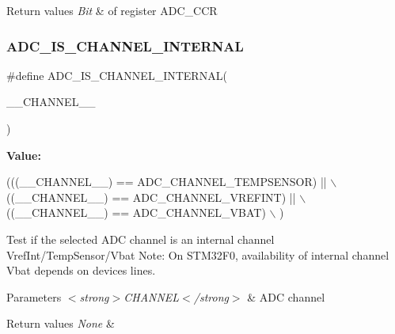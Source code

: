 \begin{DoxyRetVals}{Return values}
{\em Bit} & of register A\+D\+C\+\_\+\+C\+CR \\
\hline
\end{DoxyRetVals}
\mbox{\label{group___a_d_c_ex___private___macros_gafc2b5a27b9e60b2822591a19cbca11ff}} 
\subsubsection{\texorpdfstring{A\+D\+C\+\_\+\+I\+S\+\_\+\+C\+H\+A\+N\+N\+E\+L\+\_\+\+I\+N\+T\+E\+R\+N\+AL}{ADC\_IS\_CHANNEL\_INTERNAL}}
{\footnotesize\ttfamily \#define A\+D\+C\+\_\+\+I\+S\+\_\+\+C\+H\+A\+N\+N\+E\+L\+\_\+\+I\+N\+T\+E\+R\+N\+AL(\begin{DoxyParamCaption}\item[{}]{\+\_\+\+\_\+\+C\+H\+A\+N\+N\+E\+L\+\_\+\+\_\+ }\end{DoxyParamCaption})}

{\bfseries Value\+:}
\begin{DoxyCode}
(((\_\_CHANNEL\_\_) == ADC\_CHANNEL\_TEMPSENSOR) ||                                 \(\backslash\)
  ((\_\_CHANNEL\_\_) == ADC\_CHANNEL\_VREFINT)    ||                                 \(\backslash\)
  ((\_\_CHANNEL\_\_) == ADC\_CHANNEL\_VBAT)                                          \(\backslash\)
 )
\end{DoxyCode}


Test if the selected A\+DC channel is an internal channel Vref\+Int/\+Temp\+Sensor/\+Vbat Note\+: On S\+T\+M32\+F0, availability of internal channel Vbat depends on devices lines. 


\begin{DoxyParams}{Parameters}
{\em $<$strong$>$\+C\+H\+A\+N\+N\+E\+L$<$/strong$>$} & A\+DC channel \\
\hline
\end{DoxyParams}

\begin{DoxyRetVals}{Return values}
{\em None} & \\
\hline
\end{DoxyRetVals}
\mbox{\label{group___a_d_c_ex___private___macros_gaba41910dcb2b449c613a5ef638862e77}} 
